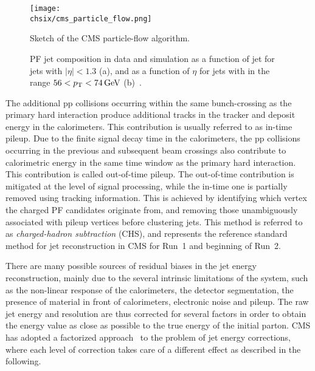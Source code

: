 \begin{figure}[!htb]
 \begin{center}
  \texttt{[image: \\chsix/cms\_particle\_flow.png]}
 \end{center}
 \caption{Sketch of the CMS particle-flow algorithm.}
 \label{fig:PFalgo}
\end{figure}

\begin{figure}[!htb]
\centering
{}
\caption{PF jet composition in data and simulation as a function of jet \pt for jets with $|\eta| < 1.3$ (a), and as a function of $\eta$ for jets with \pt in the range $56 < p_{\mathrm{T}} < 74\,\text{Ge\hspace{-.08em}V}$ (b)~\cite{Khachatryan:2016kdb}.}
\label{fig:PFjet_composition}
\end{figure}

The additional pp collisions occurring within the same bunch-crossing as the primary hard interaction produce additional tracks in the tracker and deposit energy in the calorimeters. This contribution is usually referred to as in-time pileup. Due to the finite signal decay time in the calorimeters, the pp collisions occurring in the previous and subsequent beam crossings also contribute to calorimetric energy in the same time window as the primary hard interaction. This contribution is called out-of-time pileup.
The out-of-time contribution is mitigated at the level of signal processing, while the in-time one is partially removed using tracking information. This is achieved by identifying which vertex the charged PF candidates originate from, and removing those unambiguously associated with pileup vertices before clustering jets. This method is referred to as \textit{charged-hadron subtraction} (CHS), and represents the reference standard method for jet reconstruction in CMS for Run~1 and beginning of Run~2.

There are many possible sources of residual biases in the jet energy reconstruction, mainly due to the several intrinsic limitations of the system, such as the non-linear response of the calorimeters, the detector segmentation, the presence of material in front of calorimeters, electronic noise and pileup. The raw jet energy and resolution are thus corrected for several factors in order to obtain the energy value as close as possible to the true energy of the initial parton. CMS has adopted a factorized approach~\cite{1748-0221-6-11-P11002} to the problem of jet energy corrections, where each level of correction takes care of a different effect as described in the following.

